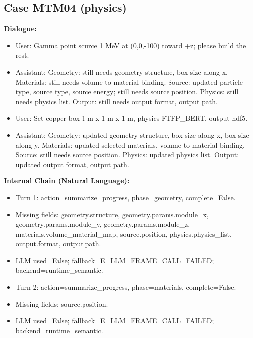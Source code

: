 \documentclass[11pt]{ctexart}
\begin{document}
\subsection{Case MTM04 (physics)}
\textbf{Dialogue:}
\begin{itemize}
\item User: Gamma point source 1 MeV at (0,0,-100) toward +z; please build the rest.
\item Assistant: Geometry: still needs geometry structure, box size along x. Materials: still needs volume-to-material binding. Source: updated particle type, source type, source energy; still needs source position. Physics: still needs physics list. Output: still needs output format, output path.
\item User: Set copper box 1 m x 1 m x 1 m, physics FTFP\_BERT, output hdf5.
\item Assistant: Geometry: updated geometry structure, box size along x, box size along y. Materials: updated selected materials, volume-to-material binding. Source: still needs source position. Physics: updated physics list. Output: updated output format, output path.
\end{itemize}
\textbf{Internal Chain (Natural Language):}
\begin{itemize}
\item Turn 1: action=summarize\_progress, phase=geometry, complete=False.
\item Missing fields: geometry.structure, geometry.params.module\_x, geometry.params.module\_y, geometry.params.module\_z, materials.volume\_material\_map, source.position, physics.physics\_list, output.format, output.path.
\item LLM used=False; fallback=E\_LLM\_FRAME\_CALL\_FAILED; backend=runtime\_semantic.
\item Turn 2: action=summarize\_progress, phase=materials, complete=False.
\item Missing fields: source.position.
\item LLM used=False; fallback=E\_LLM\_FRAME\_CALL\_FAILED; backend=runtime\_semantic.
\end{itemize}
\end{document}
